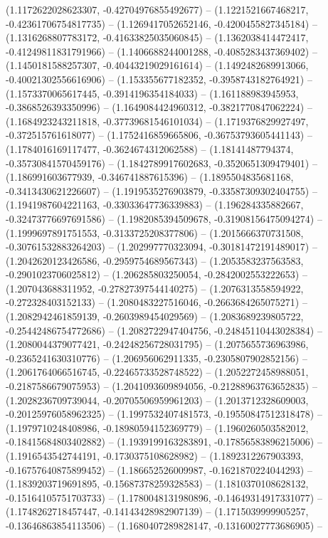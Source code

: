 \begin{scope}[blend group = overlay]
(1.1172622028623307, -0.42704976855492677) -- 
(1.1221521667468217, -0.42361706754817735) -- 
(1.1269417052652146, -0.4200455827345184) -- 
(1.1316268807783172, -0.41633825035060845) -- 
(1.1362038414472417, -0.41249811831791966) -- 
(1.1406688244001288, -0.4085283437369402) -- 
(1.1450181588257307, -0.40443219029161614) -- 
(1.1492482689913066, -0.40021302556616906) -- 
(1.153355677182352, -0.3958743182764921) -- 
(1.1573370065617445, -0.3914196354184033) -- 
(1.161188983945953, -0.3868526393350996) -- 
(1.1649084424960312, -0.3821770847062224) -- 
(1.1684923243211818, -0.37739681546101034) -- 
(1.1719376829927497, -0.372515761618077) -- 
(1.1752416859665806, -0.36753793605441143) -- 
(1.1784016169117477, -0.3624674312062588) -- 
(1.18141487794374, -0.35730841570459176) -- 
(1.1842789917602683, -0.3520651309479401) -- 
(1.186991603677939, -0.346741887615396) -- 
(1.1895504835681168, -0.3413430621226607) -- 
(1.1919535276903879, -0.33587309302404755) -- 
(1.1941987604221163, -0.33033647736339883) -- 
(1.196284335882667, -0.32473776697691586) -- 
(1.1982085394509678, -0.31908156475094274) -- 
(1.1999697891751553, -0.3133725208377806) -- 
(1.2015666370731508, -0.30761532883264203) -- 
(1.202997770323094, -0.30181472191489017) -- 
(1.2042620123426586, -0.2959754689567343) -- 
(1.2053583237563583, -0.2901023706025812) -- 
(1.206285803250054, -0.2842002553222653) -- 
(1.207043688311952, -0.27827397544140275) -- 
(1.2076313558594922, -0.272328403152133) -- 
(1.2080483227516046, -0.2663684265075271) -- 
(1.2082942461859139, -0.2603989454029569) -- 
(1.2083689239805722, -0.25442486754772686) -- 
(1.2082722947404756, -0.24845110443028384) -- 
(1.2080044379077421, -0.24248256728031795) -- 
(1.2075655736963986, -0.2365241630310776) -- 
(1.206956062911335, -0.2305807902852156) -- 
(1.2061764066516745, -0.22465733528748522) -- 
(1.2052272458988051, -0.2187586679075953) -- 
(1.2041093609894056, -0.21288963763652835) -- 
(1.2028236709739044, -0.20705506959961203) -- 
(1.2013712328609003, -0.20125976058962325) -- 
(1.1997532407481573, -0.19550847512318478) -- 
(1.1979710248408986, -0.18980594152369779) -- 
(1.1960260503582012, -0.18415684803402882) -- 
(1.1939199163283891, -0.17856583896215006) -- 
(1.1916543542744191, -0.1730375108628982) -- 
(1.1892312267903393, -0.16757640875899452) -- 
(1.186652526009987, -0.1621870224044293) -- 
(1.1839203719691895, -0.15687378259328583) -- 
(1.1810370108628132, -0.15164105751703733) -- 
(1.1780048131980896, -0.14649314917331077) -- 
(1.1748262718457447, -0.14143428982907139) -- 
(1.1715039999905257, -0.13646863854113506) -- 
(1.1680407289828147, -0.13160027773686905) -- 

\end{scope}
